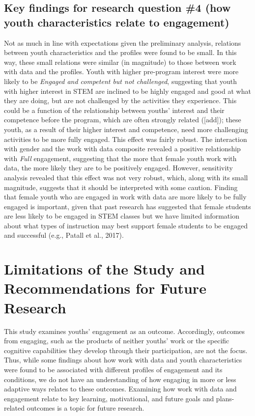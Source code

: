 \documentclass[]{book}
\theoremstyle{definition}
\theoremstyle{definition}
\theoremstyle{definition}
\theoremstyle{remark}
\begin{document}
\subsection{Key findings for research question \#4 (how youth
characteristics relate to
engagement)}\label{key-findings-for-research-question-4-how-youth-characteristics-relate-to-engagement}

Not as much in line with expectations given the preliminary analysis,
relations between youth characteristics and the profiles were found to
be small. In this way, these small relations were similar (in magnitude)
to those between work with data and the profiles. Youth with higher
pre-program interest were more likely to be \emph{Engaged and competent
but not challenged}, suggesting that youth with higher interest in STEM
are inclined to be highly engaged and good at what they are doing, but
are not challenged by the activities they experience. This could be a
function of the relationship between youths' interest and their
competence before the program, which are often strongly related
({[}add{]}); these youth, as a result of their higher interest and
competence, need more challenging activities to be more fully engaged.
This effect was fairly robust. The interaction with gender and the work
with data composite revealed a positive relationship with \emph{Full}
engagement, suggesting that the more that female youth work with data,
the more likely they are to be positively engaged. However, sensitivity
analysis revealed that this effect was not very robust, which, along
with its small magnitude, suggests that it should be interpreted with
some caution. Finding that female youth who are engaged in work with
data are more likely to be fully engaged is important, given that past
research has suggested that female students are less likely to be
engaged in STEM classes but we have limited information about what types
of instruction may best support female students to be engaged and
successful (e.g., Patall et al., 2017).

\section{Limitations of the Study and Recommendations for Future
Research}\label{limitations-of-the-study-and-recommendations-for-future-research}

This study examines youths' engagement as an outcome. Accordingly,
outcomes from engaging, such as the products of neither youths' work or
the specific cognitive capabilities they develop through their
participation, are not the focus. Thus, while some findings about how
work with data and youth characteristics were found to be associated
with different profiles of engagement and its conditions, we do not have
an understanding of how engaging in more or less adaptive ways relates
to these outcomes. Examining how work with data and engagement relate to
key learning, motivational, and future goals and plans-related outcomes
is a topic for future research.
\end{document}
